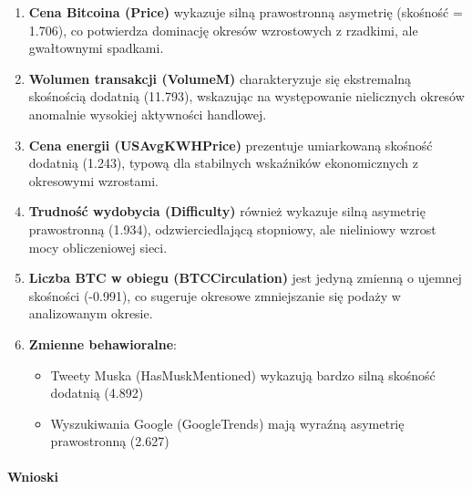 \documentclass[
  11pt,
]{article}
\providecommand{\tightlist}{%
  \setlength{\itemsep}{0pt}\setlength{\parskip}{0pt}}
\begin{document}
\begin{enumerate}
\def\labelenumi{\arabic{enumi}.}
\item
  \textbf{Cena Bitcoina (Price)} wykazuje silną prawostronną asymetrię
  (skośność = 1.706), co potwierdza dominację okresów wzrostowych z
  rzadkimi, ale gwałtownymi spadkami.
\item
  \textbf{Wolumen transakcji (VolumeM)} charakteryzuje się ekstremalną
  skośnością dodatnią (11.793), wskazując na występowanie nielicznych
  okresów anomalnie wysokiej aktywności handlowej.
\item
  \textbf{Cena energii (USAvgKWHPrice)} prezentuje umiarkowaną skośność
  dodatnią (1.243), typową dla stabilnych wskaźników ekonomicznych z
  okresowymi wzrostami.
\item
  \textbf{Trudność wydobycia (Difficulty)} również wykazuje silną
  asymetrię prawostronną (1.934), odzwierciedlającą stopniowy, ale
  nieliniowy wzrost mocy obliczeniowej sieci.
\item
  \textbf{Liczba BTC w obiegu (BTCCirculation)} jest jedyną zmienną o
  ujemnej skośności (-0.991), co sugeruje okresowe zmniejszanie się
  podaży w analizowanym okresie.
\item
  \textbf{Zmienne behawioralne}:

  \begin{itemize}
  \tightlist
  \item
    Tweety Muska (HasMuskMentioned) wykazują bardzo silną skośność
    dodatnią (4.892)
  \item
    Wyszukiwania Google (GoogleTrends) mają wyraźną asymetrię
    prawostronną (2.627)
  \end{itemize}
\end{enumerate}

\paragraph{Wnioski}\label{wnioski-3}
\end{document}
